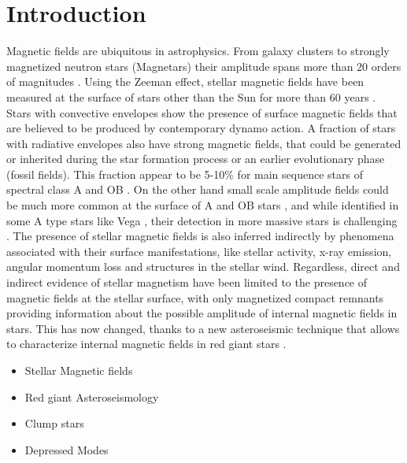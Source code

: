 \section{Introduction}
\label{intro}
Magnetic fields are ubiquitous in astrophysics. From  galaxy clusters to strongly magnetized neutron stars (Magnetars) their amplitude spans more than 20 orders of magnitudes \citep{Brandenburg_2005}. Using the Zeeman effect, stellar magnetic fields have been measured at the surface of stars other than the Sun for more than 60 years \citep{Babcock_1947,Landstreet_1992,Donati_2009}. 
Stars with convective envelopes show the presence of surface magnetic fields that are believed to be produced by contemporary dynamo action. A fraction of stars with radiative envelopes also have strong magnetic fields, that could be generated or inherited during the star formation process or an earlier evolutionary phase (fossil fields). This fraction appear to be 5-10\% for main sequence stars of spectral class A \citep[e.g.,][]{Auri_re_2004} and OB \citep{2012ASPC..464..405W}. On the other hand small scale amplitude fields could be much more common at the surface of A and OB stars \citep{Cantiello_2011}, and while identified in some A type stars like Vega \cite{Ligni_res_2009}, their detection in more massive stars is challenging \cite{2013A&A...554A..93K}.
The presence of  stellar magnetic fields is also inferred indirectly by phenomena associated with their surface manifestations, like stellar activity, x-ray emission, angular momentum loss and structures in the stellar wind. 
Regardless, direct and indirect evidence of stellar magnetism have been limited to the presence of magnetic fields at the stellar surface, with only magnetized compact remnants providing information about the possible amplitude of internal magnetic fields in stars.
This has now changed, thanks to a new asteroseismic technique that allows to characterize internal magnetic fields in red giant stars \cite{Fuller_2015}. 
\begin{itemize}
\item Stellar Magnetic fields
\item Red giant Asteroseismology
\item Clump stars
\item Depressed Modes
\end{itemize}


  